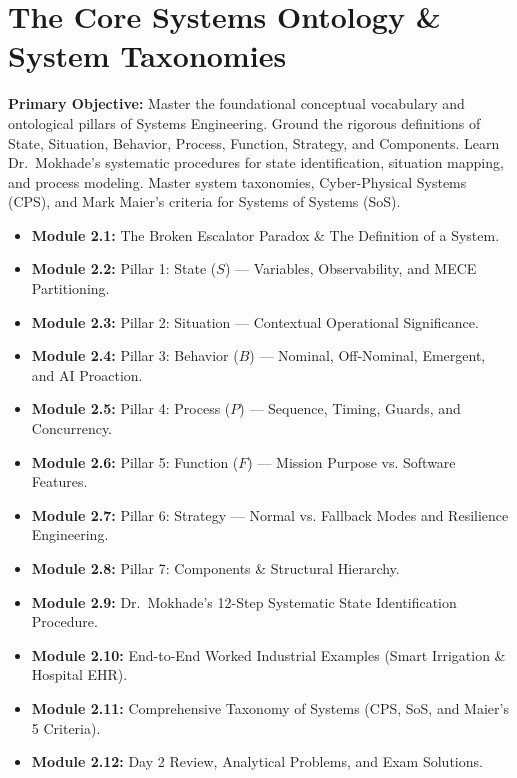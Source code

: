 \chapter{The Core Systems Ontology \& System Taxonomies}
\label{chap:day2}

\begin{tcolorbox}[colback=sePrimary!5!white,colframe=sePrimary,title={\sffamily \textbf{DAY 2 CURRICULUM OVERVIEW \& LEARNING TARGETS}}]
\small
\textbf{Primary Objective:} Master the foundational conceptual vocabulary and ontological pillars of Systems Engineering. Ground the rigorous definitions of State, Situation, Behavior, Process, Function, Strategy, and Components. Learn Dr.~Mokhade's systematic procedures for state identification, situation mapping, and process modeling. Master system taxonomies, Cyber-Physical Systems (CPS), and Mark Maier's criteria for Systems of Systems (SoS).
\begin{itemize}[leftmargin=1.5em, itemsep=2pt]
    \item \textbf{Module 2.1:} The Broken Escalator Paradox \& The Definition of a System.
    \item \textbf{Module 2.2:} Pillar 1: State ($S$) --- Variables, Observability, and MECE Partitioning.
    \item \textbf{Module 2.3:} Pillar 2: Situation --- Contextual Operational Significance.
    \item \textbf{Module 2.4:} Pillar 3: Behavior ($B$) --- Nominal, Off-Nominal, Emergent, and AI Proaction.
    \item \textbf{Module 2.5:} Pillar 4: Process ($P$) --- Sequence, Timing, Guards, and Concurrency.
    \item \textbf{Module 2.6:} Pillar 5: Function ($F$) --- Mission Purpose vs. Software Features.
    \item \textbf{Module 2.7:} Pillar 6: Strategy --- Normal vs. Fallback Modes and Resilience Engineering.
    \item \textbf{Module 2.8:} Pillar 7: Components \& Structural Hierarchy.
    \item \textbf{Module 2.9:} Dr.~Mokhade's 12-Step Systematic State Identification Procedure.
    \item \textbf{Module 2.10:} End-to-End Worked Industrial Examples (Smart Irrigation \& Hospital EHR).
    \item \textbf{Module 2.11:} Comprehensive Taxonomy of Systems (CPS, SoS, and Maier's 5 Criteria).
    \item \textbf{Module 2.12:} Day 2 Review, Analytical Problems, and Exam Solutions.
\end{itemize}
\end{tcolorbox}

